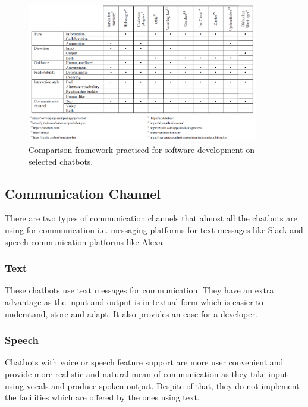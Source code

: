\begin{figure}[h]
    \centering
    \includegraphics[width=0.9\textwidth]{img/Chatbots_Comparison_Framework.PNG}
    \caption{Comparison framework practiced for software development on selected chatbots. \cite{frameworkforunderstandingchatbots}}
    \label{fig:chatcompfram}
\end{figure}

\subsection{Communication Channel}
There are two types of communication channels that almost all the chatbots are using for communication i.e. messaging platforms for text messages like Slack and speech communication platforms like Alexa. \cite{frameworkforunderstandingchatbots}

\subsubsection*{Text}
These chatbots use text messages for communication. They have an extra advantage as the input and output is in textual form which is easier to understand, store and adapt. It also provides an ease for a developer. \cite{frameworkforunderstandingchatbots}

\subsubsection*{Speech}
Chatbots with voice or speech feature support are more user convenient and provide more realistic and natural mean of communication as they take input using vocals and produce spoken output. Despite of that, they do not implement the facilities which are offered by the ones using text. \cite{frameworkforunderstandingchatbots}

